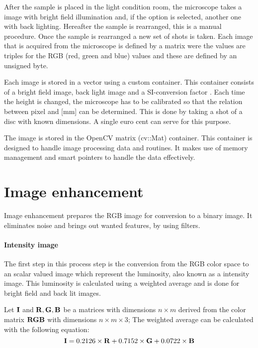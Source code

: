\documentclass[11pt,fleqn,,a4paper,twoside,openright]{book}
\begin{document}
After the sample is placed in the light condition room, the microscope takes a image with bright field illumination  and, if the option is selected, another one with back lighting.  Hereafter the sample is rearranged, this is a manual procedure. Once the sample is rearranged a new set of shots is taken. Each image that is acquired from the microscope is defined by a matrix were the values are triples for the RGB  (red, green and blue) values and these are defined by an unsigned byte. 

Each image is stored in a vector using a custom container. This container consists of a bright field image, back light image and a SI-conversion factor . Each time the height is changed, the microscope has to be calibrated so that the relation between pixel and [mm] can be determined. This is done by taking a shot of a disc with known dimensions. A single euro cent can serve for this purpose.

\begin{remark}
	The image is stored in the OpenCV matrix (cv::Mat) container. This container is  designed to handle image processing data and routines. It makes use of memory management and smart pointers to handle the data effectively. 
\end{remark}

\section{Image enhancement}
Image enhancement prepares the RGB image for conversion to a binary image. It eliminates noise and brings out wanted features, by using filters.
\paragraph{Intensity image}\label{IntensityImg} The first step in this process step is the conversion from the RGB color space to an scalar valued image which represent the luminosity, also known as a intensity image. This luminosity is calculated using a weighted average and is done for bright field and back lit images.
\begin{sBox}
	Let $\mat{I}$ and $\mat{R}, \mat{G}, \mat{B}$  be a matrices with dimensions $n \times m$ derived from the color matrix $\mat{RGB}$ with dimensions $n \times m \times 3$; The weighted average can be calculated with the following equation:
	\begin{equation}
	\mat{I} =0.2126\times \mat{R} + 0.7152\times \mat{G} + 0.0722\times \mat{B}
	\end{equation}
\end{sBox}
\end{document}
